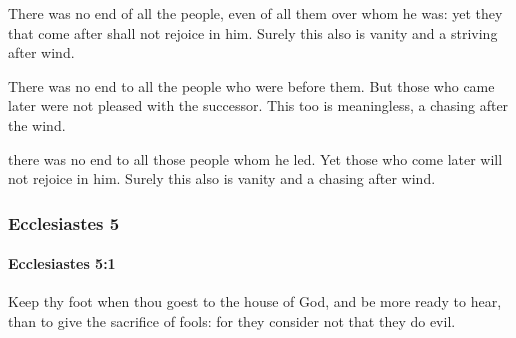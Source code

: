 			\begin{versebox}
					\item[BHS] 
					\item[LXX] 
					\item[ASV] There was no end of all the people, even of all them over whom he was: yet they that come after shall not rejoice in him. Surely this also is vanity and a striving after wind.
					\item[NIV] There was no end to all the people who were before them. But those who came later were not pleased with the successor. This too is meaningless, a chasing after the wind.
					\item[NRSV] there was no end to all those people whom he led. Yet those who come later will not rejoice in him. Surely this also is vanity and a chasing after wind.
			\end{versebox}
	\subsubsection{Ecclesiastes 5} %
		\label{ECCLESIASTES-5}

		\paragraph{Ecclesiastes 5:1} %
			\label{ECCLESIASTES-5-1}

			Keep thy foot when thou goest to the house of God, and be more ready to hear, than to give the sacrifice of fools: for they consider not that they do evil.

